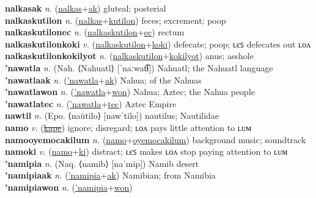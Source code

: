 \textbf{nalkasak} \textit{n.} (\hyperref[nalkas]{nalkas}+\hyperref[ak]{ak})
gluteal; posterial \label{nalkasak} \\
\textbf{nalkaskutilon} \textit{n.} (\hyperref[nalkas]{nalkas}+\hyperref[kutilon]{kutilon})
feces; excrement; poop \label{nalkaskutilon} \\
\textbf{nalkaskutilonec} \textit{n.} (\hyperref[nalkaskutilon]{nalkaskutilon}+\hyperref[ec]{ec})
rectum \label{nalkaskutilonec} \\
\textbf{nalkaskutilonkoki} \textit{v.} (\hyperref[nalkaskutilon]{nalkaskutilon}+\hyperref[koki]{koki})
defecate; poop; ʟєꜱ defecates out ʟᴏᴧ \label{nalkaskutilonkoki} \\
\textbf{nalkaskutilonkokilyot} \textit{n.} (\hyperref[nalkaskutilon]{nalkaskutilon}+\hyperref[kokilyot]{kokilyot})
anus; asshole \label{nalkaskutilonkokilyot} \\
\textbf{'nawatla} \textit{n.} (Nah. ⟨Nahuatl⟩ [ˈnaːwat͡ɬ])
Nahuatl; the Nahuatl language \label{'nawatla} \\
\textbf{'nawatlaak} \textit{n.} (\hyperref['nawatla]{'nawatla}+\hyperref[ak]{ak})
Nahua; of the Nahuas \label{'nawatlaak} \\
\textbf{'nawatlawon} \textit{n.} (\hyperref['nawatla]{'nawatla}+\hyperref[won]{won})
Nahua; Aztec; the Nahua people \label{'nawatlawon} \\
\textbf{'nawatlatec} \textit{n.} (\hyperref['nawatla]{'nawatla}+\hyperref[tec]{tec})
Aztec Empire \label{'nawatlatec} \\
\textbf{nawtil} \textit{n.} (Epo. ⟨naŭtilo⟩ [nawˈtilo])
nautilus; Nautilidae \label{nawtil} \\
\textbf{namo} \textit{v.} (\hyperref[kape]{\sout{kape}})
ignore; disregard; ʟᴏᴧ pays little attention to ʟᴜᴍ \label{namo} \\
\textbf{namooyemocakilum} \textit{n.} (\hyperref[namo]{namo}+\hyperref[oyemocakilum]{oyemocakilum})
background music; soundtrack \label{namooyemocakilum} \\
\textbf{namoki} \textit{v.} (\hyperref[namo]{namo}+\hyperref[ki]{ki})
distract; ʟєꜱ makes ʟᴏᴧ stop paying attention to ʟᴜᴍ \label{namoki} \\
\textbf{'namipia} \textit{n.} (Naq. ⟨namib⟩ [naˈmip])
Namib desert \label{'namipia} \\
\textbf{'namipiaak} \textit{n.} (\hyperref['namipia]{'namipia}+\hyperref[ak]{ak})
Namibian; from Namibia \label{'namipiaak} \\
\textbf{'namipiawon} \textit{n.} (\hyperref['namipia]{'namipia}+\hyperref[won]{won})
